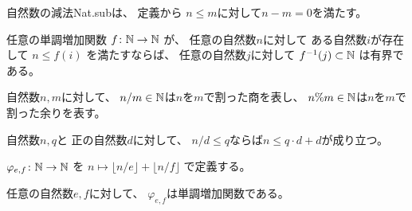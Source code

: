 \begin{remark}
自然数の減法\textsf{Nat.sub}は、
定義から
$n \le m$に対して$n-m=0$を満たす。
\end{remark}

\begin{lemma}
\label{lm:finite_of_bounded_of_Nat}
\leanok
{}
\end{lemma}

\begin{lemma}
\label{lm:monotone_bounded}
\leanok
任意の単調増加関数
$
f \colon \mathbb{N} \to \mathbb{N}
$
が、
任意の自然数$n$に対して
ある自然数$i$が存在して
$
n \le f(i)
$
を満たすならば、
任意の自然数$j$に対して
$
f^{-1}(j) \subset \mathbb{N}
$
は有界である。
\end{lemma}

自然数$n,m$に対して、
$n / m \in \mathbb{N}$は$n$を$m$で割った商を表し、
$n \% m \in \mathbb{N}$は$n$を$m$で割った余りを表す。

\begin{lemma}
\label{lm:nat_div_pnat_le}
\leanok
自然数$n,q$と
正の自然数$d$に対して、
$n / d \le q$ならば$n \le q \cdot d + d$が成り立つ。
\end{lemma}


\begin{definition}
\label{df:φ}
\leanok
$
\varphi_{e,f} \colon \mathbb{N} \to \mathbb{N}
$
を
$
n \mapsto \lfloor n / e \rfloor + \lfloor n / f \rfloor
$
で定義する。
\end{definition}

\begin{lemma}
\label{lm:φ_monotone}
\leanok
任意の自然数$e, f$に対して、
$\varphi_{e,f}$は単調増加関数である。
\end{lemma}


